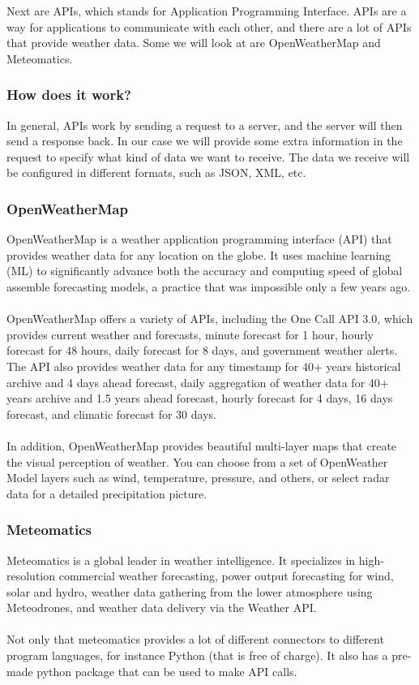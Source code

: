 \documentclass[../paper.tex]{subfiles}
\begin{document}
    Next are APIs, which stands for Application Programming Interface.
    APIs are a way for applications to communicate with each other, and there are a lot of APIs that provide weather data.
    Some we will look at are OpenWeatherMap and Meteomatics.

    \subsubsection{How does it work?}
    In general, APIs work by sending a request to a server, and the server will then send a response back.
    In our case we will provide some extra information in the request to specify what kind of data we want to receive.
    The data we receive will be configured in different formats, such as JSON, XML, etc.

    \subsubsection{OpenWeatherMap}
    OpenWeatherMap is a weather application programming interface (API) that provides weather data for any location on the globe.
    It uses machine learning (ML) to significantly advance both the accuracy and computing speed of global assemble forecasting models, a practice that was impossible only a few years ago\cite{b1}.
    \\\\
    OpenWeatherMap offers a variety of APIs, including the One Call API 3.0, which provides current weather and forecasts, minute forecast for 1 hour, hourly forecast for 48 hours, daily forecast for 8 days, and government weather alerts\cite{b1}.
    The API also provides weather data for any timestamp for 40+ years historical archive and 4 days ahead forecast, daily aggregation of weather data for 40+ years archive and 1.5 years ahead forecast, hourly forecast for 4 days, 16 days forecast, and climatic forecast for 30 days\cite{b1}.
    \\\\
    In addition, OpenWeatherMap provides beautiful multi-layer maps that create the visual perception of weather.
    You can choose from a set of OpenWeather Model layers such as wind, temperature, pressure, and others, or select radar data for a detailed precipitation picture\cite{b1}.

    \subsubsection{Meteomatics}
    Meteomatics is a global leader in weather intelligence\cite{c1}.
    It specializes in high-resolution commercial weather forecasting, power output forecasting for wind, solar and hydro, weather data gathering from the lower atmosphere using Meteodrones, and weather data delivery via the Weather API\cite{c3}.
    \\\\
    Not only that meteomatics provides a lot of different connectors to different program languages, for instance Python (that is free of charge)\cite{c1}.
    It also has a pre-made python package that can be used to make API calls\cite{c5}.
\end{document}
